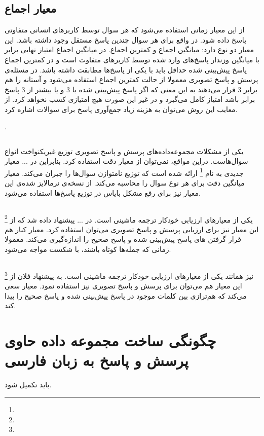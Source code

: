 {	\subsection{معیار اجماع}
	{
		از این معیار زمانی استفاده می‌شود که هر سوال توسط کاربرهای انسانی متفاوتی پاسخ داده شود. در واقع برای هر سوال چندین پاسخ مستقل وجود داشته باشد. این معیار دو نوع دارد: میانگین اجماع و کمترین اجماع. در میانگین اجماع امتیاز نهایی برابر با میانگین وزندار پاسخ‌های وارد شده توسط کاربرهای متفاوت است و در کمترین اجماع پاسخ پیش‌بینی شده حداقل باید با یکی از پاسخ‌ها مطابقت داشته باشد. در مسئله‌ی پرسش و پاسخ تصویری معمولا از حالت کمترین اجماع استفاده می‌شود و آستانه را هم برابر 3 قرار می‌دهند به این معنی که اگر پاسخ پیش‌بینی شده با 3 و یا بیشتر از 3 پاسخ برابر باشد امتیاز کامل می‌گبرد و در غیر این صورت هیچ امتیازی کسب نخواهد کرد. از معایب این روش می‌توان به هزینه زیاد جمع‌آوری پاسخ برای سوالات اشاره کرد.
	}

.	\subsection{ }
	{
		یکی از مشکلات مجموعه‌داده‌های پرسش و پاسخ تصویری توزیع غیریکنواخت انواع سوال‌هاست. دراین مواقع، نمی‌توان از معیار دقت استفاده کرد. بنابراین  در ... معیار جدیدی به نام 
	\footnote{}
		ارائه شده است که توزیع نامتوازن سوال‌ها را جبران می‌کند. معیار 
	میانگین دقت برای هر نوع سوال را محاسبه می‌کند. از نسخه‌ی نرمالایز شده‌ی این معیار نیز برای رفع مشکل بایاس در توزیع پاسخ‌ها استفاده می‌شود.
	}

	\subsection{ }
	{
		\footnote{}
		یکی از معیارهای ارزیابی خودکار ترجمه ماشینی است. در ... پیشنهاد داده شد که از این معیار نیز برای ارزیابی پرسش و پاسخ تصویری می‌توان استفاده کرد. معیار 
		کنار هم قرار گرفتن 
		های پاسخ پیش‌‌بینی شده و پاسخ صحیح را اندازه‌گیری می‌کند. معمولا
	زمانی که جمله‌ها کوتاه باشند، با شکست مواجه می‌‌شود.
		
	}

	\subsection{}
	{
		\footnote{}
		نیز همانند
	یکی از معیارهای ارزیابی خودکار ترجمه ماشینی است. به پیشنهاد فلان از این معیار هم می‌توان برای پرسش و پاسخ تصویری نیز استفاده نمود. معیار 
		سعی می‌کند که هم‌ترازی بین کلمات موجود در پاسخ پیش‌بینی شده و پاسخ صحیح را پیدا کند.
	}


}


\section{ چگونگی ساخت مجموعه داده حاوی پرسش و پاسخ به زبان فارسی}
باید تکمیل شود.